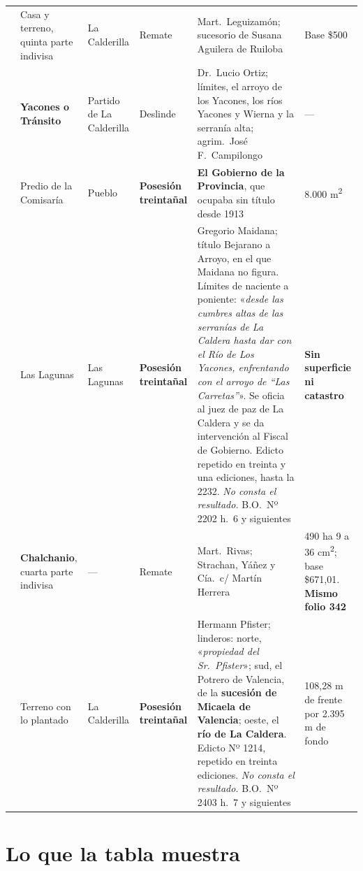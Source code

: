 {\begin{longtable}{@{}p{0.8cm}p{2.4cm}p{1.6cm}p{2.1cm}p{2.9cm}p{2.1cm}@{}}
\addlinespace
1942 & Casa y terreno, quinta parte indivisa & La Calderilla & Remate & Mart.\ Leguizamón; sucesorio de Susana Aguilera de Ruiloba & Base \$500 \\
\addlinespace
1942 & \textbf{Yacones o Tránsito} & Partido de La Calderilla & Deslinde & Dr.\ Lucio Ortiz; límites, el arroyo de los Yacones, los ríos Yacones y Wierna y la serranía alta; agrim.\ José F.\ Campilongo & --- \\
\addlinespace
1943 & Predio de la Comisaría & Pueblo & \textbf{Posesión treintañal} & \textbf{El Gobierno de la Provincia}, que ocupaba sin título desde 1913 & 8.000 m\textsuperscript{2} \\
\addlinespace
1945 & Las Lagunas & Las Lagunas & \textbf{Posesión treintañal} & Gregorio Maidana; título Bejarano a Arroyo, en el que Maidana no figura. Límites de naciente a poniente: «\textit{desde las cumbres altas de las serranías de La Caldera hasta dar con el Río de Los Yacones, enfrentando con el arroyo de ``Las Carretas''}». Se oficia al juez de paz de La Caldera y se da intervención al Fiscal de Gobierno. Edicto repetido en treinta y una ediciones, hasta la 2232. \textit{No consta el resultado.} B.O.\ Nº 2202 h.\ 6 y siguientes & \textbf{Sin superficie ni catastro} \\
\addlinespace
1945 & \textbf{Chalchanio}, cuarta parte indivisa & --- & Remate & Mart.\ Rivas; Strachan, Yáñez y Cía.\ c/ Martín Herrera & 490 ha 9 a 36 cm\textsuperscript{2}; base \$671,01. \textbf{Mismo folio 342} \\
\addlinespace
1945 & Terreno con lo plantado & La Calderilla & \textbf{Posesión treintañal} & Hermann Pfister\index{Pfister, Hermann}; linderos: norte, «\textit{propiedad del Sr.\ Pfister}»; sud, el Potrero de Valencia, de la \textbf{sucesión de Micaela de Valencia}; oeste, el \textbf{río de La Caldera}. Edicto Nº 1214, repetido en treinta ediciones. \textit{No consta el resultado.} B.O.\ Nº 2403 h.\ 7 y siguientes & 108,28 m de frente por 2.395 m de fondo \\
\bottomrule
\end{longtable}}

\section*{Lo que la tabla muestra}

